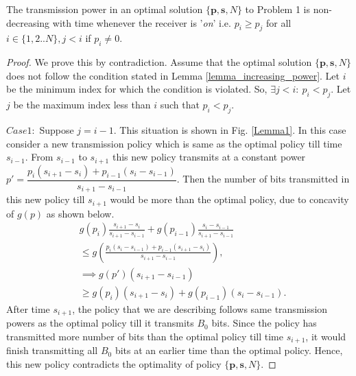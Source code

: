 
\begin{lemma}
The transmission power in an optimal solution $\{\textbf{p},\textbf{s},N\}$ to Problem 1 is non-decreasing with time whenever the receiver is '\textit{on}' i.e. $p_i\ge p_j$ for all $i\in \{1,2..N\},j<i$ if $p_i\neq 0$. 
\label{lemma_increasing_power}
\end{lemma}
\begin{proof}
We prove this by contradiction. Assume that the optimal solution $\{\textbf{p},\textbf{s},N\}$ does not follow the condition stated in Lemma \ref{lemma_increasing_power}. Let $i$ be the minimum index for which the condition is violated. So, $\exists j<i:\ p_i<p_j $. Let $j$ be the maximum index less than $i$ such that $p_i<p_j$. 

%

$Case 1:$ Suppose $j=i-1$. This situation is shown in Fig. \ref{Lemma1}. In this case consider a new transmission policy which is same as the optimal policy till time $s_{i-1}$. From $s_{i-1}$ to $s_{i+1}$ this new policy transmits at a constant power $p'=\dfrac{p_i(s_{i+1}-s_{i})+p_{i-1}(s_{i}-s_{i-1})}{s_{i+1}-s_{i-1}}$. Then the number of bits transmitted in this new policy till $s_{i+1}$ would be more than the optimal policy, due to concavity of $g(p)$ as shown below.
\begin{align*}
&g(p_i)\frac{s_{i+1}-s_{i}}{s_{i+1}-s_{i-1}}+g(p_{i-1})\frac{s_{i}-s_{i-1}}{s_{i+1}-s_{i-1}}
\\ 
&\le g\left(\frac{p_i(s_{i}-s_{i-1})+p_{i-1}(s_{i+1}-s_{i})}{s_{i+1}-s_{i-1}}\right),
\\
&\implies g(p')(s_{i+1}-s_{i-1})
\\
&\ge g(p_i)(s_{i+1}-s_{i})+g(p_{i-1})(s_{i}-s_{i-1}).  
\end{align*}
After time $s_{i+1}$, the policy that we are describing follows same transmission powers as the optimal policy till it transmits $B_0$ bits. Since the policy has transmitted more number of bits than the optimal policy till time $s_{i+1}$, it would finish transmitting all $B_0$ bits at an earlier time than the optimal policy. Hence, this new policy contradicts the optimality of policy $\{\textbf{p},\textbf{s},N\}$.


\end{proof}
